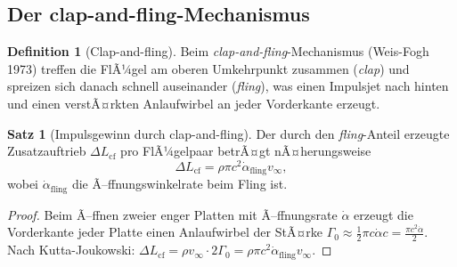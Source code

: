 ﻿\documentclass[a4paper,12pt]{article}
\theoremstyle{definition}
\newtheorem{definition}{Definition}
\newtheorem{satz}{Satz}
\begin{document}
	\subsection{Der clap-and-fling-Mechanismus}
	
	\begin{definition}[Clap-and-fling]
		Beim \textit{clap-and-fling}-Mechanismus (Weis-Fogh 1973) treffen die FlÃ¼gel am
		oberen Umkehrpunkt zusammen (\textit{clap}) und spreizen sich danach schnell auseinander
		(\textit{fling}), was einen Impulsjet nach hinten und einen verstÃ¤rkten Anlaufwirbel
		an jeder Vorderkante erzeugt.
	\end{definition}
	
	\begin{satz}[Impulsgewinn durch clap-and-fling]
		\label{satz:clap}
		Der durch den \textit{fling}-Anteil erzeugte Zusatzauftrieb $\Delta L_{\mathrm{cf}}$
		pro FlÃ¼gelpaar betrÃ¤gt nÃ¤herungsweise
		\[
		\Delta L_{\mathrm{cf}} = \rho \pi c^2 \dot{\alpha}_{\mathrm{fling}} v_\infty,
		\]
		wobei $\dot{\alpha}_{\mathrm{fling}}$ die Ã–ffnungswinkelrate beim Fling ist.
	\end{satz}
	
	\begin{proof}
		Beim Ã–ffnen zweier enger Platten mit Ã–ffnungsrate $\dot{\alpha}$ erzeugt die
		Vorderkante jeder Platte einen Anlaufwirbel der StÃ¤rke
		$\Gamma_0 \approx \frac{1}{2}\pi c \dot{\alpha} c = \frac{\pi c^2 \dot{\alpha}}{2}$.
		Nach Kutta-Joukowski: $\Delta L_{\mathrm{cf}} = \rho v_\infty \cdot 2\Gamma_0
		= \rho \pi c^2 \dot{\alpha}_{\mathrm{fling}} v_\infty$.
	\end{proof}
	
\end{document}
